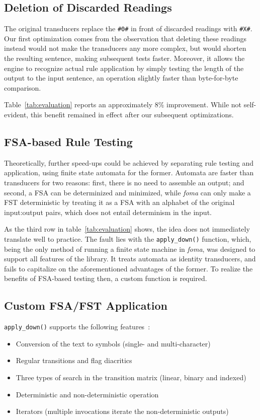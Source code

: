 \documentclass[11pt]{article}
\begin{document}
\subsection{Deletion of Discarded Readings}
\label{sec:speed_deletex}

The original transducers replace the \texttt{\#0\#} in front of discarded readings
with \texttt{\#X\#}. Our first optimization comes from the observation that
deleting these readings instead would not make the transducers any more complex,
but would shorten the resulting sentence, making subsequent tests faster.
Moreover, it allows the engine to recognize actual rule application by simply
testing the length of the output to the input sentence, an operation slightly
faster than byte-for-byte comparison.

Table~\ref{tab:evaluation} reports an approximately 8\% improvement. While not
self-evident, this benefit remained in effect after our subsequent optimizations.

\subsection{FSA-based Rule Testing}
\label{sec:speed_fsa}

Theoretically, further speed-ups could be achieved by separating rule testing
and application, using finite state automata for the former. Automata are faster
than transducers for two reasons: first, there is no need to assemble an output;
and second, a FSA can be determinized and minimized, while \emph{foma} can
only make a FST deterministic by treating it as a FSA with an alphabet of the
original input:output pairs, which does not entail determinism in the input.

As the third row in table~\ref{tab:evaluation} shows, the idea does not immediately
translate well to practice. The fault lies with the \texttt{apply\_down()}
function, which, being the only method of running a finite state machine in
\emph{foma}, was designed to support all features of the library. It treats
automata as identity transducers, and fails to capitalize
on the aforementioned advantages of the former. To realize the benefits of
FSA-based testing then, a custom function is required.

\subsection{Custom FSA/FST Application}
\label{sec:speed_custom}

\texttt{apply\_down()} supports the following features~\cite{Hulden:2009b}:
\begin{itemize}
  \item Conversion of the text to symbols (single- and multi-character)
  \item Regular transitions and flag diacritics
  \item Three types of search in the transition matrix (linear, binary and indexed)
  \item Deterministic and non-deterministic operation
  \item Iterators (multiple invocations iterate the non-deterministic outputs)
\end{itemize}
\end{document}
